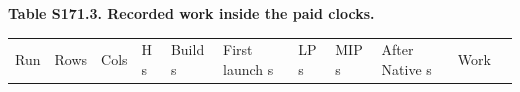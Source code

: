 \documentclass[
  american,
  11pt,
]{article}
\newcounter{none} %
\begin{document}

\textbf{Table S171.3. Recorded work inside the paid clocks.}

{\def\LTcaptype{none} %
\begin{longtable}[]{@{}
  >{\raggedright\arraybackslash}p{}
  >{\raggedright\arraybackslash}p{}
  >{\raggedright\arraybackslash}p{}
  >{\raggedright\arraybackslash}p{}
  >{\raggedright\arraybackslash}p{}
  >{\raggedright\arraybackslash}p{}
  >{\raggedright\arraybackslash}p{}
  >{\raggedright\arraybackslash}p{}
  >{\raggedright\arraybackslash}p{}
  >{\raggedright\arraybackslash}p{}
  >{\raggedright\arraybackslash}p{}@{}}
\toprule\noalign{}
\begin{minipage}[b]{\linewidth}\raggedright
Run
\end{minipage} & \begin{minipage}[b]{\linewidth}\raggedright
Rows
\end{minipage} & \begin{minipage}[b]{\linewidth}\raggedright
Cols
\end{minipage} & \begin{minipage}[b]{\linewidth}\raggedright
H s
\end{minipage} & \begin{minipage}[b]{\linewidth}\raggedright
Build s
\end{minipage} & \begin{minipage}[b]{\linewidth}\raggedright
First launch s
\end{minipage} & \begin{minipage}[b]{\linewidth}\raggedright
LP s
\end{minipage} & \begin{minipage}[b]{\linewidth}\raggedright
MIP s
\end{minipage} & \begin{minipage}[b]{\linewidth}\raggedright
After Native s
\end{minipage} & \begin{minipage}[b]{\linewidth}\raggedright
Work

\end{minipage}
\end{longtable}}
\end{document}
